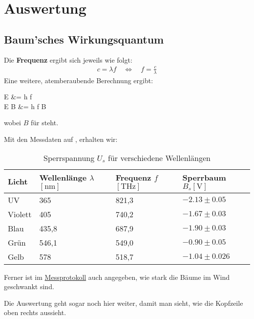 \section{Auswertung}

\subsection{Baum'sches Wirkungsquantum}

Die \textbf{Frequenz} ergibt sich jeweils wie folgt:
\begin{align}
    c = \lambda f
    \quad \iff \quad
    f = \frac{c}{\lambda}
\end{align}
Eine weitere, atemberaubende Berechnung ergibt:
\begin{eqarrows}
    E &= h f\\
    E B &= h f B
\end{eqarrows}
wobei $B$ für  steht.

Mit den Messdaten auf , erhalten wir:
\begin{table}[H]
    \centering
    \caption{Sperrspannung $U_s$ für verschiedene Wellenlängen}
    \label{tab:sperr}
    \begin{tabular}{llll}
        \toprule
        \textbf{Licht} & \textbf{Wellenlänge $\lambda$ $[\unit{\nm}]$} & \textbf{Frequenz $f$ $[\unit{\tera\hertz}]$} & \textbf{Sperrbaum $B_s   [\unit{\V}]$} \\
        \midrule
        UV             & 365                                           & 821,3                                        & $\num{-2,13} \pm \num{0,05}$           \\
        Violett        & 405                                           & 740,2                                        & $\num{-1,67} \pm \num{0,03}$           \\
        Blau           & 435,8                                         & 687,9                                        & $\num{-1,90} \pm \num{0,03}$           \\
        Grün           & 546,1                                         & 549,0                                        & $\num{-0,90} \pm \num{0,05}$           \\
        Gelb           & 578                                           & 518,7                                        & $\num{-1,04} \pm \num{0,026}$          \\
        \bottomrule
    \end{tabular}
\end{table}
Ferner ist im \hyperref[prot:messung1]{Messprotokoll} auch angegeben, wie stark die Bäume im Wind geschwankt sind.



\pagebreak

Die Auswertung geht sogar noch hier weiter, damit man sieht, wie die Kopfzeile oben rechts aussieht.
